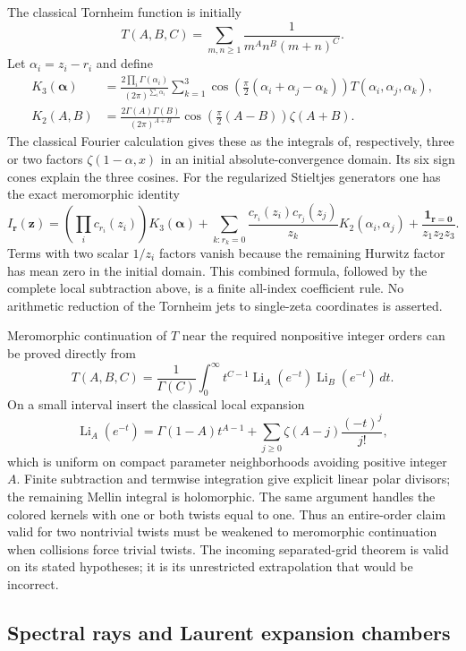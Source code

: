 The classical Tornheim function is initially
\[
 T(A,B,C)=\sum_{m,n\ge1}\frac1{m^A n^B(m+n)^C}.
\]
Let $\alpha_i=z_i-r_i$ and define
\begin{align*}
 K_3(\boldsymbol\alpha)
 &=\frac{2\prod_i\Gamma(\alpha_i)}{(2\pi)^{\sum_i\alpha_i}}
   \sum_{k=1}^3
   \cos\!\left(\frac\pi2(\alpha_i+\alpha_j-\alpha_k)\right)
        T(\alpha_i,\alpha_j,\alpha_k),\\
 K_2(A,B)&=\frac{2\Gamma(A)\Gamma(B)}{(2\pi)^{A+B}}
          \cos\!\left(\frac\pi2(A-B)\right)\zeta(A+B).
\end{align*}
The classical Fourier calculation \cite{EspinosaMoll} gives these as the integrals of,
respectively, three or two factors $\zeta(1-\alpha,x)$ in an initial
absolute-convergence domain. Its six sign cones explain the three
cosines. For the regularized Stieltjes generators one has the exact
meromorphic identity
\[
 I_{\boldsymbol r}(\boldsymbol z)
 =\left(\prod_i c_{r_i}(z_i)\right)K_3(\boldsymbol\alpha)
  +\sum_{k:r_k=0}\frac{c_{r_i}(z_i)c_{r_j}(z_j)}{z_k}
                  K_2(\alpha_i,\alpha_j)
  +\frac{\mathbf 1_{\boldsymbol r=\boldsymbol0}}{z_1z_2z_3}.
\]
Terms with two scalar $1/z_i$ factors vanish because the remaining
Hurwitz factor has mean zero in the initial domain. This combined
formula, followed by the complete local subtraction above, is a
finite all-index coefficient rule. No arithmetic reduction of the
Tornheim jets to single-zeta coordinates is asserted.

Meromorphic continuation of $T$ near the required nonpositive integer
orders can be proved directly from
\[
 T(A,B,C)=\frac1{\Gamma(C)}\int_0^\infty
 t^{C-1}\operatorname{Li}_A(e^{-t})\operatorname{Li}_B(e^{-t})\,dt.
\]
On a small interval insert the classical local expansion \cite[Equation~25.12.12]{DLMFPolylog}
\[
 \operatorname{Li}_A(e^{-t})
 =\Gamma(1-A)t^{A-1}
       +\sum_{j\ge0}\zeta(A-j)\frac{(-t)^j}{j!},
\]
which is uniform on compact parameter neighborhoods avoiding positive
integer $A$. Finite subtraction and termwise integration give explicit
linear polar divisors; the remaining Mellin integral is holomorphic.
The same argument handles the colored kernels with one or both twists
equal to one. Thus an entire-order claim valid for two nontrivial
twists must be weakened to meromorphic continuation when collisions
force trivial twists. The incoming separated-grid theorem is valid
on its stated hypotheses; it is its unrestricted extrapolation that
would be incorrect.

\subsection{Spectral rays and Laurent expansion chambers}
\label{cl:spectral}

